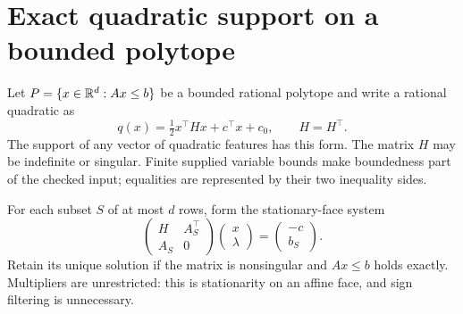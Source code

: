 \section{Exact quadratic support on a bounded polytope}\label{sec:polytope}

Let $P=\{x\in\mathbb R^d:Ax\le b\}$ be a bounded rational polytope and
write a rational quadratic as
\[
q(x)=\tfrac12x^\top Hx+c^\top x+c_0,\qquad H=H^\top.
\]
The support of any vector of quadratic features has this form. The matrix
$H$ may be indefinite or singular. Finite supplied variable bounds make
boundedness part of the checked input; equalities are represented by their
two inequality sides.

For each subset $S$ of at most $d$ rows, form the stationary-face system
\begin{equation}\label{eq:face-system}
\begin{pmatrix}H&A_S^\top\\A_S&0\end{pmatrix}
\begin{pmatrix}x\\\lambda\end{pmatrix}
=\begin{pmatrix}-c\\b_S\end{pmatrix}.
\end{equation}
Retain its unique solution if the matrix is nonsingular and $Ax\le b$
holds exactly. Multipliers are unrestricted: this is stationarity on an
affine face, and sign filtering is unnecessary.

